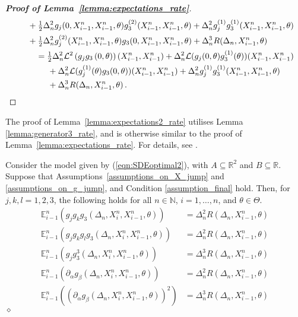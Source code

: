 \documentclass[11pt,a4paper]{article}
\newcommand{\xtl}{{X^n_{i-1}}}
\newcommand{\xtr}{X^n_i}
\newcommand{\EE}{{\mathbb E}}
\newcommand{\RR}{{\mathbb R}}
\newcommand{\NN}{{\mathbb N}}
\renewcommand{\ll}{{\mathcal{L}}}
\newcommand{\dqed}{{\leavevmode \unskip \penalty9999 \hbox{} \nobreak \hfill \quad \hbox{$\diamond$}}}
\numberwithin{equation}{section}
\numberwithin{theorem}{section}
\begin{document}
\begin{proof}[\textbf{Proof of Lemma~\ref{lemma:expectations_rate}}]
\begin{align*}
\begin{split}
&\hspace{5mm} +\tfrac{1}{2}\Delta_n^2 
  g_{j}(0,\xtl,\xtl, \theta)g_{3}^{(2)}(\xtl,\xtl, \theta) + \Delta_n^2 
  g_{j}^{(1)}g_{3}^{(1)}(\xtl,\xtl, \theta) \\
&\hspace{5mm} + \tfrac{1}{2}\Delta_n^2 
 g_{j}^{(2)}(\xtl,\xtl, \theta)g_{3}(0,\xtl,\xtl, \theta) + \Delta_n^3 R(\Delta_n,\xtl, \theta)
\end{split}\\
\begin{split}
&= \tfrac{1}{2}\Delta_n^2 \ll^2\left( g_{j}g_{3}\left(0,
      \theta\right)\right)(\xtl,\xtl) + \Delta_n^2 \ll( g_{j}(0,
\theta)g_{3}^{(1)}(\theta))(\xtl,\xtl) \\
&\hspace{5mm} + \Delta_n^2 \ll( g_{j}^{(1)}(
\theta)g_{3}(0, \theta))(\xtl,\xtl)+ \Delta_n^2 
  g_{j}^{(1)}g_{3}^{(1)}(\xtl,\xtl, \theta) \\
&\hspace{5mm} + \Delta_n^3 R(\Delta_n,\xtl, \theta)\,.
\end{split}
\end{align*}
\end{proof}
%
The proof of Lemma~\ref{lemma:expectations2_rate} utilises Lemma
\ref{lemma:generator3_rate}, and is otherwise
similar to the proof of Lemma~\ref{lemma:expectations_rate}.
For details, see \cite[Section 3.A.4]{phdthesis}.
%
\begin{lemma}
Consider the model given by (\ref{eqn:SDEoptimal2}), with
  $A\subseteq \RR^2$ and $B\subseteq \RR$. Suppose that Assumptions~\ref{assumptions_on_X_jump} and
\ref{assumptions_on_g_jump}, and Condition
\ref{assumption_final} hold. Then, for $j,k,l =
1,2,3$, the following holds for all $n\in \NN$, $i=1,\ldots,n$, and $\theta \in \Theta$.
\begin{align*}
\EE^n_{i-1}\left( g_{j}g_{k}g_{3}(\Delta_n,\xtr,\xtl,
  \theta)\right)
&= \Delta_n^2 R(\Delta_n,\xtl,
  \theta)\\
\EE^n_{i-1}\left( g_{j}g_{k}g_{l}g_{3}(\Delta_n,\xtr,\xtl,
  \theta)\right)
&= \Delta_n^2 R(\Delta_n,\xtl,
  \theta)\\
\EE^n_{i-1}\left( g_{j}g_{3}^3(\Delta_n,\xtr,\xtl,
  \theta)\right)
&= \Delta_n^3 R(\Delta_n,\xtl,
  \theta)\\
\EE^n_{i-1}\left( \partial_\alpha g_\beta(\Delta_n,\xtr,\xtl,
  \theta)\right) &= \Delta_n^2 R(\Delta_n,\xtl, \theta)\\
\EE^n_{i-1}\left( \left(\partial_\alpha g_\beta(\Delta_n,\xtr,\xtl,
  \theta)\right)^2 \right)
&= \Delta_n^3 R(\Delta_n,\xtl, \theta)
\end{align*}
\dqed
\label{lemma:expectations2_rate}
\end{lemma}
\end{document}
